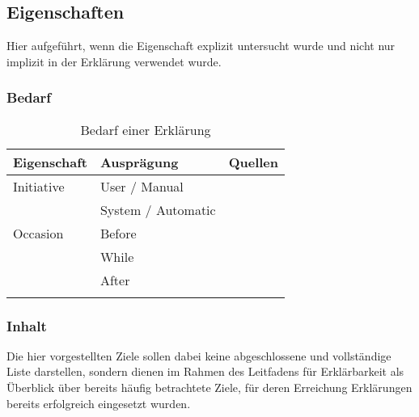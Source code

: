 \subsection{Eigenschaften}

Hier aufgeführt, wenn die Eigenschaft explizit untersucht wurde und nicht nur implizit in der Erklärung verwendet wurde.

\subsubsection*{Bedarf}

\begin{longtable}{|p{}|p{}|p{}|}
    \hline
    \textbf{Eigenschaft}    & \textbf{Ausprägung}   & \textbf{Quellen} \\ \hline
    Initiative              &  User / Manual        & \cite{chazette_end-users_nodate} \cite{tintarev_designing_nodate} \cite{wiegand_id_2020} \\
                            &  System / Automatic   & \cite{chazette_end-users_nodate} \cite{eiband_impact_2019} \cite{wiegand_id_2020} \cite{schaffer_i_2019} \cite{yamada_evaluating_2016} \\
    \hline
    Occasion                &  Before               & \cite{rosenfeld_explainability_2019} \cite{wiegand_id_2020} \cite{kunkel_let_2019} \cite{koo_why_2015} \cite{haspiel_explanations_2018} \\
                            &  While                & \cite{rosenfeld_explainability_2019} \cite{wiegand_id_2020} \cite{kunkel_let_2019} \\
                            &  After                & \cite{rosenfeld_explainability_2019} \cite{wiegand_id_2020} \cite{kunkel_let_2019} \cite{koo_why_2015} \cite{haspiel_explanations_2018} \cite{wiegand2019drive} \\
    \hline
\caption{Bedarf einer Erklärung}
\label{tab:explanation_demands}
\end{longtable}

\subsubsection*{Inhalt}

Die hier vorgestellten Ziele sollen dabei keine abgeschlossene und vollständige Liste darstellen, sondern dienen im Rahmen des Leitfadens für Erklärbarkeit als Überblick über bereits häufig betrachtete Ziele, für deren Erreichung Erklärungen bereits erfolgreich eingesetzt wurden.

